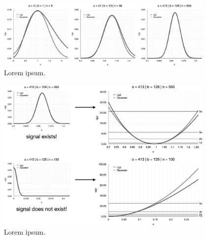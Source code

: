 \begin{figure}[htb]
    \centering
    \includegraphics[width=0.95\textwidth]{fig/stats/like_gauss_approx.png}
    \caption{
        Lorem ipsum.
    }
    \label{fig:like_gauss_approx}
\end{figure}

\begin{figure}[htb]
    \centering
    \includegraphics[width=0.95\textwidth]{fig/stats/CL_examples.png}
    \caption{
        Lorem ipsum.
    }
    \label{fig:CL_examples}
\end{figure}

